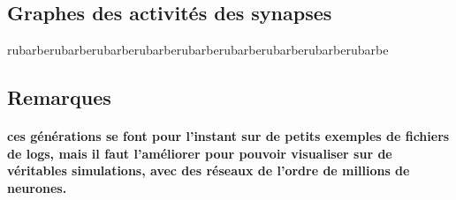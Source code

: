 \documentclass[a4paper,10pt]{article}
\begin{document}
\subsection*{Graphes des activités des synapses}

rubarberubarberubarberubarberubarberubarberubarberubarberubarbe

\subsection{Remarques}
\paragraph{
ces générations se font pour l’instant sur de petits exemples de fichiers de logs, mais il faut l’améliorer pour pouvoir visualiser sur de véritables simulations, avec des réseaux de l’ordre de millions de neurones.
}
\end{document}
